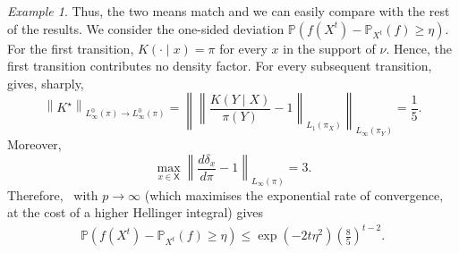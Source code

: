 \documentclass[11pt]{article}
\theoremstyle{plain}
\theoremstyle{remark}
\newtheorem{example}{Example}
\begin{document}
\begin{example}
Thus, the two means match and we can easily compare with the rest of the results. We consider the one-sided deviation $
\mathbb P\left(
    f(X^t)-\mathbb P_{X^t}(f)\geq\eta
\right).$ For the first transition, \(K(\cdot\mid x)=\pi\) for every
\(x\) in the support of \(\nu\). Hence, the first transition
contributes no density factor. For every subsequent transition,
 gives, sharply,
\begin{equation}
\left\|K^\star\right\|_
    {L_\infty^0(\pi)\to L_\infty^0(\pi)}
=
\left\|
    \left\|
        \frac{K(Y\mid X)}{\pi(Y)}-1
    \right\|_{L_1(\pi_X)}
\right\|_{L_\infty(\pi_Y)}
=
\frac15.
\label{eq:nonStationaryTimeDependentContraction}
\end{equation}
Moreover,
\[
\max_{x\in\mathsf X}
\left\|
    \frac{d\delta_x}{d\pi}-1
\right\|_{L_\infty(\pi)}
=3.
\]
Therefore,~ with $p\to\infty$ (which maximises the exponential rate of convergence, at the cost of a higher Hellinger integral) gives
\begin{align}
\mathbb P\left(
    f(X^t)-\mathbb P_{X^t}(f)\geq\eta
\right) \leq
\exp\left(-2t\eta^2\right)\left(\frac85\right)^{t-2}.
\label{eq:nonStationaryTimeDependentOurBound}
\end{align}


\end{example}
\end{document}
